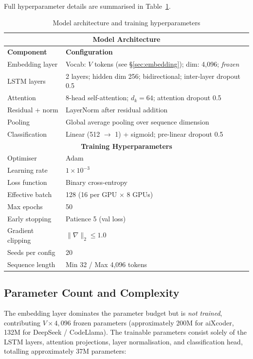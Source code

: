 Full hyperparameter details are summarised in Table~\ref{tab:model_config}.

\begin{table}[h]
\centering
\caption{Model architecture and training hyperparameters}
\label{tab:model_config}
\begin{tabular}{@{} l l @{}}
\toprule
\multicolumn{2}{c}{\textbf{Model Architecture}} \\
\midrule
\textbf{Component} & \textbf{Configuration} \\
\midrule
Embedding layer   & Vocab: $V$ tokens (see \S\ref{sec:embedding}); dim: 4{,}096; \textit{frozen} \\
LSTM layers       & 2 layers; hidden dim 256; bidirectional; inter-layer dropout 0.5 \\
Attention         & 8-head self-attention; $d_k = 64$; attention dropout 0.5 \\
Residual + norm   & LayerNorm after residual addition \\
Pooling           & Global average pooling over sequence dimension \\
Classification    & Linear (512 $\to$ 1) + sigmoid; pre-linear dropout 0.5 \\
\midrule
\multicolumn{2}{c}{\textbf{Training Hyperparameters}} \\
\midrule
Optimiser         & Adam \\
Learning rate     & $1 \times 10^{-3}$ \\
Loss function     & Binary cross-entropy \\
Effective batch   & 128 (16 per GPU $\times$ 8 GPUs) \\
Max epochs        & 50 \\
Early stopping    & Patience 5 (val loss) \\
Gradient clipping & $\|\nabla\|_2 \leq 1.0$ \\
Seeds per config  & 20 \\
Sequence length   & Min 32 / Max 4{,}096 tokens \\
\bottomrule
\end{tabular}
\end{table}

\subsection{Parameter Count and Complexity}
\label{sec:complexity}

The embedding layer dominates the parameter budget but is \emph{not trained},
contributing $V \times 4{,}096$ frozen parameters (approximately 200M for
aiXcoder, 132M for DeepSeek / CodeLlama).
The trainable parameters consist solely of the LSTM layers, attention
projections, layer normalisation, and classification head, totalling
approximately 37M parameters:

